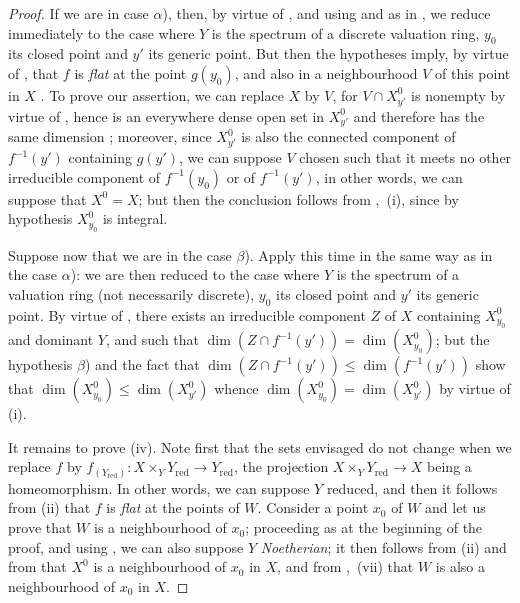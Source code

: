 \begin{proof}
If we are in case $\alpha$), then, by virtue of , and using  and  as in , we reduce immediately to the case where $Y$ is the spectrum of a discrete valuation ring, $y_0$ its closed point and $y'$ its generic point.
But then the hypotheses imply, by virtue of , that $f$ is \emph{flat} at the point $g(y_0)$, and also in a neighbourhood $V$ of this point in $X$ .
To prove our assertion, we can replace $X$ by $V$, for $V\cap X_{y'}^0$ is nonempty by virtue of , hence is an everywhere dense open set in $X_{y'}^0$ and therefore has the same dimension ; moreover, since $X_{y'}^0$ is also the connected component of $f^{-1}(y')$ containing $g(y')$, we can suppose $V$ chosen such that it meets no other irreducible component of $f^{-1}(y_0)$ or of $f^{-1}(y')$, in other words, we can suppose that $X^0=X$; but then the conclusion follows from ,~(i), since by hypothesis $X_{y_0}^0$ is integral.

Suppose now that we are in the case $\beta$).
Apply this time  in the same way as  in the case $\alpha$): we are then reduced to the case where $Y$ is the spectrum of a valuation ring (not necessarily discrete), $y_0$ its closed point and $y'$ its generic point.
By virtue of , there exists an irreducible component $Z$ of $X$ containing $X_{y_0}^0$ and dominant $Y$, and such that $\dim(Z\cap f^{-1}(y'))=\dim(X_{y_0}^0)$; but the hypothesis $\beta$) and the fact that $\dim(Z\cap f^{-1}(y'))\leq\dim(f^{-1}(y'))$ show that $\dim(X_{y_0}^0)\leq\dim(X_{y'}^0)$ whence $\dim(X_{y_0}^0)=\dim(X_{y'}^0)$ by virtue of (i).

It remains to prove (iv).
Note first that the sets envisaged do not change when we replace $f$ by $f_{(Y_\mathrm{red})}:X\times_Y Y_\mathrm{red}\to Y_\mathrm{red}$, the projection $X\times_Y Y_\mathrm{red}\to X$ being a homeomorphism.
In other words, we can suppose $Y$ reduced, and then it follows from (ii) that $f$ is \emph{flat} at the points of $W$.
Consider a point $x_0$ of $W$ and let us prove that $W$ is a neighbourhood of $x_0$; proceeding as at the beginning of the proof, and using , we can also suppose $Y$ \emph{Noetherian}; it then follows from (ii) and from  that $X^0$ is a neighbourhood of $x_0$ in $X$, and from ,~(vii) that $W$ is also a neighbourhood of $x_0$ in $X$.
\end{proof}

